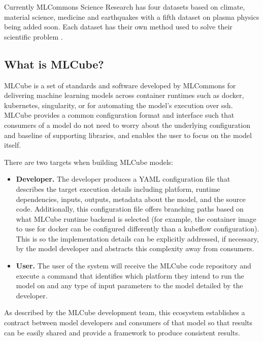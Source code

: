 \documentclass[sigplan,screen]{acmart}
\providecommand{\mlcube}{MLCube}
\begin{document}
Currently MLCommons Science Research has four datasets based on
climate, material science, medicine and earthquakes with a fifth
dataset on plasma physics being added soon. Each dataset has their own
method used to solve their scientific problem
\cite{www-mlcommons-science}.

\subsection{What is \mlcube{}?}

\mlcube{} is a set of standards and software developed by MLCommons
for delivering machine learning models across container runtimes such
as docker, kubernetes, singularity, or for automating the model's
execution over ssh.  \mlcube{} provides a common configuration format
and interface such that consumers of a model do not need to worry
about the underlying configuration and baseline of supporting
libraries, and enables the user to focus on the model
itself\cite{www-mlcube}.

There are two targets when building \mlcube{} models:

\begin{itemize}
  
    \item \textbf{Developer.}  The developer produces a YAML
      configuration file that describes the target execution details
      including platform, runtime dependencies, inputs, outputs,
      metadata about the model, and the source code.  Additionally,
      this configuration file offers branching paths based on what
      \mlcube{} runtime backend is selected (for example, the
      container image to use for docker can be configured differently
      than a kubeflow configuration).  This is so the implementation
      details can be explicitly addressed, if necessary, by the model
      developer and abstracts this complexity away from consumers.

    \item \textbf{User.}  The user of the system will receive the
      \mlcube{} code repository and execute a command that identifies
      which platform they intend to run the model on and any type of
      input parameters to the model detailed by the developer.
\end{itemize}

As described by the \mlcube{} development team, this ecosystem
establishes a contract between model developers and consumers of that
model so that results can be easily shared and provide a framework to
produce consistent results.
\end{document}
